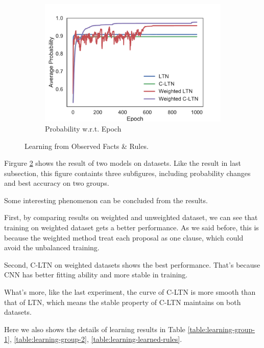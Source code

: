 \begin{figure}[!]
    \begin{subfigure}[]{0.24\textwidth}
        \includegraphics[width=\textwidth]{img/curve2.pdf}
        \caption{Probability w.r.t. Epoch}
        \label{fig:learning-prob-epoch}
    \end{subfigure}
    \caption{Learning from Observed Facts \& Rules.}
    \label{fig:learning}
\end{figure}

Firgure \ref{fig:learning} shows the result of two models on datasets. Like the result in last subsection, this figure containts three subfigures, including probability changes and best accuracy on two groups.

Some interesting phenomenon can be concluded from the results.

First, by comparing results on weighted and unweighted dataset, we can see that training on weighted dataset gets a better performance.
As we said before, this is because the weighted method treat each proposal as one clause, which could avoid the unbalanced training.

Second, C-LTN on weighted datasets shows the best performance. That's because CNN has better fitting ability and more stable in training.

What's more, like the last experiment, the curve of C-LTN is more smooth than that of LTN, which means the stable property of C-LTN maintains on both datasets.

Here we also shows the details of learning results in Table \ref{table:learning-group-1}, \ref{table:learning-group-2}, \ref{table:learning-learned-rules}.

